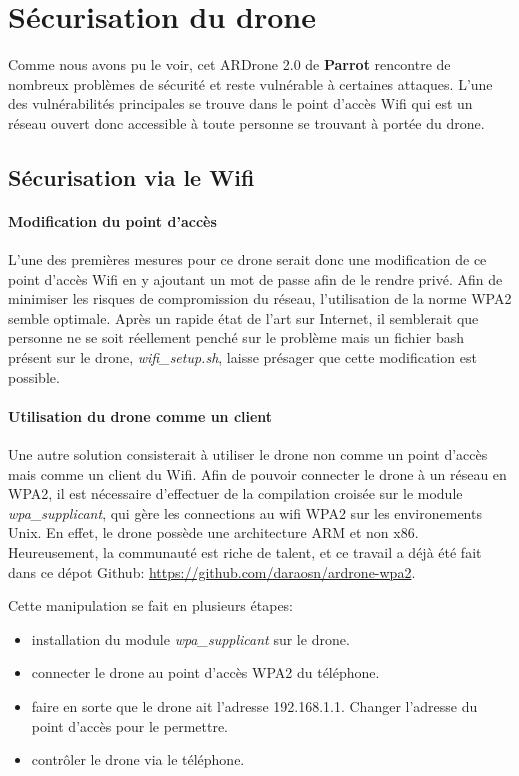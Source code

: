 \section{Sécurisation du drone}
Comme nous avons pu le voir, cet ARDrone 2.0 de \textbf{Parrot} rencontre de nombreux problèmes de sécurité et reste vulnérable à certaines attaques. L'une des vulnérabilités principales se trouve dans le point d'accès Wifi qui est un réseau ouvert donc accessible à toute personne se trouvant à portée du drone.

\subsection{Sécurisation via le Wifi}
\paragraph{Modification du point d'accès}
L'une des premières mesures pour ce drone serait donc une modification de ce point d'accès Wifi en y ajoutant un mot de passe afin de le rendre privé. Afin de minimiser les risques de compromission du réseau, l'utilisation de la norme WPA2 semble optimale. Après un rapide état de l'art sur Internet, il semblerait que personne ne se soit réellement penché sur le problème mais un fichier bash présent sur le drone, \textit{wifi\_setup.sh}, laisse présager que cette modification est possible.

\paragraph{Utilisation du drone comme un client}
Une autre solution consisterait à utiliser le drone non comme un point d'accès mais comme un client du Wifi.
Afin de pouvoir connecter le drone à un réseau en WPA2, il est nécessaire d'effectuer de la compilation croisée sur le module \textit{wpa\_supplicant}, qui gère les connections au wifi WPA2 sur les environements Unix. En effet, le drone possède une architecture ARM et non x86. Heureusement, la communauté est riche de talent, et ce travail a déjà été fait dans ce dépot Github: \url{https://github.com/daraosn/ardrone-wpa2}.

Cette manipulation se fait en plusieurs étapes:
\begin{itemize}
  \item installation du module \textit{wpa\_supplicant} sur le drone.
  \item connecter le drone au point d'accès WPA2 du téléphone.
  \item faire en sorte que le drone ait l'adresse 192.168.1.1. Changer l'adresse du point d'accès pour le permettre.
  \item contrôler le drone via le téléphone.
\end{itemize}

